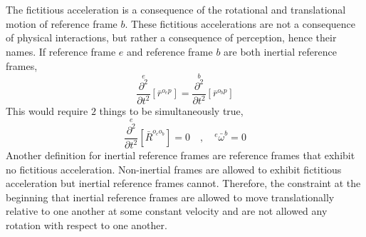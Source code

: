 \documentclass[a4paper, 12pt]{report}
\begin{document}
\begin{center}
\\~\\The fictitious acceleration is a consequence of the rotational and translational motion of reference frame $b$. These fictitious accelerations are not a consequence of physical interactions, but rather a consequence of perception, hence their names. If reference frame $e$ and reference frame $b$ are both inertial reference frames, 
$$\overset{e}{\frac{\partial^{2}}{\partial t^{2}}}[\bar{r}^{o_{e}p}] =  \overset{b}{\frac{\partial^{2}}{\partial t^{2}}}[\bar{r}^{o_{b}p}]$$
This would require $2$ things to be simultaneously true,
$$\overset{e}{\frac{\partial^{2}}{\partial t^{2}}}[\bar{R}^{o_{e}o_{b}}] = 0 \quad,\quad {}^{e}\bar{\omega}^{b} = 0$$
Another definition for inertial reference frames are reference frames that exhibit no fictitious acceleration. Non-inertial frames are allowed to exhibit fictitious acceleration but inertial reference frames cannot. Therefore, the constraint at the beginning that inertial reference frames are allowed to move translationally relative to one another at some constant velocity and are not allowed any rotation with respect to one another.


\end{center}
\end{document}
